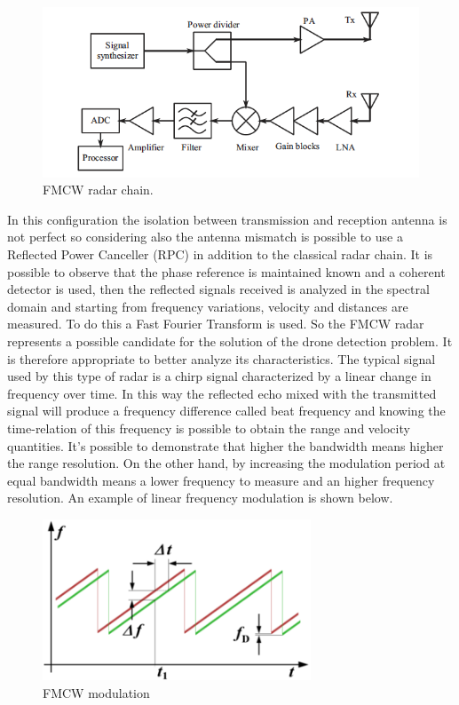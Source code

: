 \begin{figure}[h!]
    \centering
    \includegraphics[width=13cm]{imgs/FMCW radar chain.png}
    \caption{FMCW radar chain.}
    \label{FMCWradarchain}
\end{figure}
In this configuration the isolation between transmission and reception antenna is not perfect so considering also the antenna mismatch  is possible to use a Reflected Power Canceller (RPC) in addition to the classical radar chain. 
It is possible to observe that the phase reference is maintained known and a coherent detector is used, then the reflected signals received is analyzed in the spectral domain and starting from frequency variations, velocity and distances are measured. To do this a Fast Fourier Transform is used. So the FMCW radar represents a possible candidate for the solution of the drone detection problem. It is therefore appropriate to better analyze its characteristics. The typical signal used by this type of radar is a chirp signal characterized by a linear change in frequency over time. In this way the reflected echo mixed with the transmitted signal will produce a frequency difference called beat frequency and knowing the time-relation of this frequency is possible to obtain the range and velocity quantities. It's possible to demonstrate that higher the bandwidth means higher the range resolution. On the other hand, by increasing the modulation period at equal bandwidth means a lower frequency to measure and an higher frequency resolution. An example of linear frequency modulation is shown below. 

\begin{figure}[h!]
    \centering
    \includegraphics[width=8cm]{imgs/Fmcw modulation.png}
    \caption{FMCW modulation}
\end{figure}


